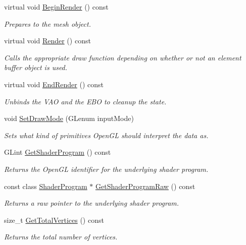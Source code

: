 \begin{DoxyCompactItemize}
virtual void \hyperlink{class_rendering_object_a878582ad56859856506a6d4c4be393e9}{Begin\+Render} () const
\begin{DoxyCompactList}\small\item\em Prepares to the mesh object. \end{DoxyCompactList}\item 
virtual void \hyperlink{class_rendering_object_aee6affd69495adc61bae0e71433d353a}{Render} () const
\begin{DoxyCompactList}\small\item\em Calls the appropriate draw function depending on whether or not an element buffer object is used. \end{DoxyCompactList}\item 
virtual void \hyperlink{class_rendering_object_abc5f87208a9c918f3d281dd673cb5a24}{End\+Render} () const
\begin{DoxyCompactList}\small\item\em Unbinds the V\+AO and the E\+BO to cleanup the state. \end{DoxyCompactList}\item 
void \hyperlink{class_rendering_object_aa627eb310f11d0e04dbbb3665f58bb4e}{Set\+Draw\+Mode} (G\+Lenum input\+Mode)
\begin{DoxyCompactList}\small\item\em Sets what kind of primitives Open\+GL should interpret the data as. \end{DoxyCompactList}\item 
G\+Lint \hyperlink{class_rendering_object_abe3637190e30c5483e9505743c75bcdb}{Get\+Shader\+Program} () const
\begin{DoxyCompactList}\small\item\em Returns the Open\+GL identifier for the underlying shader program. \end{DoxyCompactList}\item 
const class \hyperlink{class_shader_program}{Shader\+Program} $\ast$ \hyperlink{class_rendering_object_ab32a982b996ebaca66f4f8b9f4e548b2}{Get\+Shader\+Program\+Raw} () const
\begin{DoxyCompactList}\small\item\em Returns a raw pointer to the underlying shader program. \end{DoxyCompactList}\item 
size\+\_\+t \hyperlink{class_rendering_object_af83dd72431c620145b06d2e1bf7a9f3e}{Get\+Total\+Vertices} () const
\begin{DoxyCompactList}\small\item\em Returns the total number of vertices. \end{DoxyCompactList}\item 

\end{DoxyCompactItemize}

